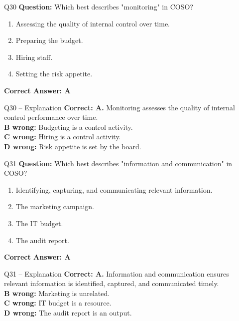 \documentclass[aspectratio=169,10pt]{beamer}
\begin{document}
	\begin{frame}[t]{Q30}
		\small
		\textbf{Question:} Which best describes "monitoring" in COSO?
		\begin{enumerate}[label=\Alph*.,itemsep=1pt,topsep=2pt]
			\item Assessing the quality of internal control over time.
			\item Preparing the budget.
			\item Hiring staff.
			\item Setting the risk appetite.
		\end{enumerate}
		\vspace{4pt}
		\textbf{Correct Answer: A}
	\end{frame}
	
	\begin{frame}[t]{Q30 -- Explanation}
		\small
		\textbf{Correct: A.} Monitoring assesses the quality of internal control performance over time. \\[4pt]
		\textbf{B wrong:} Budgeting is a control activity. \\[2pt]
		\textbf{C wrong:} Hiring is a control activity. \\[2pt]
		\textbf{D wrong:} Risk appetite is set by the board.
	\end{frame}
	
	\begin{frame}[t]{Q31}
		\small
		\textbf{Question:} Which best describes "information and communication" in COSO?
		\begin{enumerate}[label=\Alph*.,itemsep=1pt,topsep=2pt]
			\item Identifying, capturing, and communicating relevant information.
			\item The marketing campaign.
			\item The IT budget.
			\item The audit report.
		\end{enumerate}
		\vspace{4pt}
		\textbf{Correct Answer: A}
	\end{frame}
	
	\begin{frame}[t]{Q31 -- Explanation}
		\small
		\textbf{Correct: A.} Information and communication ensures relevant information is identified, captured, and communicated timely. \\[4pt]
		\textbf{B wrong:} Marketing is unrelated. \\[2pt]
		\textbf{C wrong:} IT budget is a resource. \\[2pt]
		\textbf{D wrong:} The audit report is an output.
	\end{frame}
	
\end{document}
